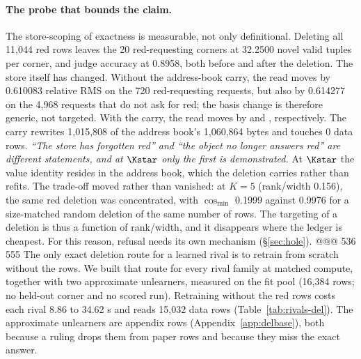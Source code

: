 \paragraph{The probe that bounds the claim.} The store-scoping of exactness is measurable, not
only definitional. Deleting all 11,044 red rows leaves the 20 red-requesting corners at 32.2500
novel valid tuples per corner, and judge accuracy at 0.8958, both before and after the deletion.
The store itself has changed. Without the address-book carry, the read moves by 0.610083
relative RMS on the 720 red-requesting requests, but also by 0.614277 on the 4,968 requests
that do not ask for red; the basis change is therefore generic, not targeted. With the carry,
the read moves by  and , respectively. The carry rewrites
1,015,808 of the address book's 1,060,864 bytes and touches 0 data rows. %
\emph{``The store has forgotten red'' and ``the object no longer answers red'' are different
statements, and at $\Kstar$ only the first is demonstrated.} At $\Kstar$ the value identity
resides in the address book, which the deletion carries rather than refits. The trade-off moved
rather than vanished: at $K=5$ (rank/width 0.156), the same red deletion was concentrated, with
$\cos_{\min}$ 0.1999 against 0.9976 for a size-matched random deletion of the same number of
rows. %
The targeting of a deletion is thus a function of rank/width, and it disappears where the ledger
is cheapest. For this reason, refusal needs its own mechanism (\S\ref{sec:hole}).
@@@ 536 555
The only exact deletion route for a learned rival is to retrain from scratch without the rows.
We built that route for every rival family at matched compute, together with two approximate
unlearners, measured on the fit pool (16,384 rows; no held-out corner and no scored run).
Retraining without the red rows costs each rival 8.86 to 34.62 s and reads 15,032 data rows
(Table~\ref{tab:rivals-del}). The approximate unlearners are appendix rows
(Appendix~\ref{app:delbase}), both because a ruling drops them from paper rows and because
they miss the exact answer. %

